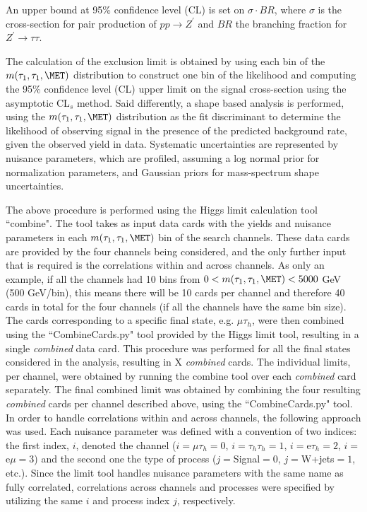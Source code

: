 An upper bound at 95\% confidence level (CL) is set on $\sigma \cdot BR$, 
where $\sigma$ is the cross-section for pair production of $pp\to Z^{\prime}$ and $BR$ the branching fraction for $Z^{\prime}\to\tau\tau$.

The calculation of the exclusion limit is obtained by using each bin of the $m(\tau_{1},\tau_{1},\MET)$ distribution to construct one bin of the likelihood 
and computing the 95\% confidence level (CL) upper limit on the signal cross-section using the asymptotic CL$_{s}$ method. 
Said differently, a shape based analysis is performed, using the $m(\tau_{1},\tau_{1},\MET)$ distribution as the fit discriminant to determine the 
likelihood of observing signal in the presence of the predicted background rate, given the observed yield in data. Systematic uncertainties are represented by nuisance parameters, which are profiled, assuming a log normal prior for normalization parameters, and Gaussian priors for mass-spectrum shape uncertainties.

The above procedure is performed using the Higgs limit calculation tool ``combine". The tool takes as input data cards with the yields and nuisance parameters in 
each $m(\tau_{1},\tau_{1},\MET)$ bin of the search channels. These data cards are provided by the four channels being considered, and the only further input that 
is required is the correlations within and across channels. As only an example, if all the channels had 10 bins from $0 < m(\tau_{1},\tau_{1},\MET) < 5000$ GeV 
(500 GeV/bin), this means there will be 10 cards per channel and therefore 40 cards in total for the four channels (if all the channels have the same bin size).
The cards corresponding to a specific final state, e.g. $\mu\tau_{h}$, were then combined using the ``CombineCards.py" tool provided by the Higgs limit tool, 
resulting in a single \textit{combined} data card. This procedure was performed for all the final states considered in the analysis, resulting in 
X \textit{combined} cards. The individual limits, per channel, were obtained by running the combine tool over each \textit{combined} card separately. The final 
combined limit was obtained by combining the four resulting \textit{combined} cards per channel described above, using the ``CombineCards.py" tool. In order to 
handle correlations within and across channels, the following approach was used. Each nuisance parameter was defined with a convention of two indices: the first 
index, $i$, denoted the channel ($i=\mu\tau_{h}=0$, $i=\tau_{h}\tau_{h}=1$, $i=$e$\tau_{h}=2$, $i=$e$\mu=3$) and the second one the type of process 
($j=$Signal$=0$, $j=$W+jets$=1$, etc.). Since the limit tool handles nuisance parameters with the same name as fully correlated, correlations across channels and 
processes were specified by utilizing the same $i$ and process index $j$, respectively.

